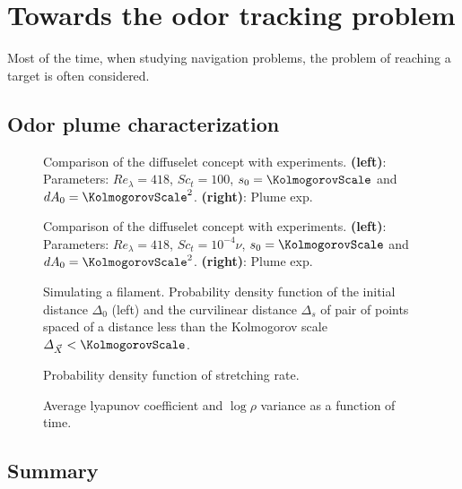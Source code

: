 \chapter{Towards the odor tracking problem}

Most of the time, when studying navigation problems, the problem of reaching a target is often considered.

\section{Odor plume characterization}

\begin{figure}
    \centering
    
    \caption{
    	Comparison of the diffuselet concept with experiments.
    	\textbf{(left)}: Parameters: $\mathit{Re}_\lambda = 418$, $\mathit{Sc_t} = 100$, $s_0 = \KolmogorovScale$ and $dA_0 = \KolmogorovScale^2$.
    	\textbf{(right)}: Plume exp.
    }
\end{figure}

\begin{figure}
    \centering
    
    \caption{
    	Comparison of the diffuselet concept with experiments.
    	\textbf{(left)}: Parameters: $\mathit{Re}_\lambda = 418$, $\mathit{Sc_t} = 10^{-4} \nu$, $s_0 = \KolmogorovScale$ and $dA_0 = \KolmogorovScale^2$.
    	\textbf{(right)}: Plume exp.
    }
\end{figure}

\begin{figure}
    \centering
    
    \caption{
		Simulating a filament. Probability density function of the initial distance $\varDelta_0$ (left) and the curvilinear distance $\varDelta_s$ of pair of points spaced of a distance less than the Kolmogorov scale $\varDelta_{\vec{X}} < \KolmogorovScale$.
    }
\end{figure}

\begin{figure}
    \centering
    
    \caption{
    	Probability density function of stretching rate.
    }
\end{figure}

\begin{figure}
    \centering
    
    \caption{
    	Average lyapunov coefficient and $\log \rho$ variance as a function of time.
    }
\end{figure}

\section{Summary}
